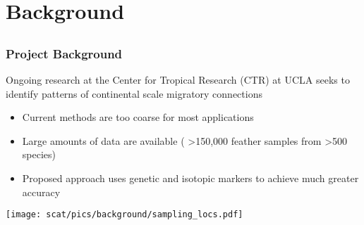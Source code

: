 \section{Background}
\subsection{}

\begin{frame}
\frametitle{Project Background}

Ongoing research at the Center for Tropical Research (CTR) at UCLA seeks to identify patterns of continental scale migratory connections 

\begin{itemize}
\item Current methods are too coarse for most applications
\item Large amounts of data are available ( \textgreater{}150,000 feather samples from \textgreater{}500 species)
\item Proposed approach uses genetic and isotopic markers to achieve much greater accuracy
\end{itemize}

\end{frame}


\begin{frame}
\begin{center}
\texttt{[image: scat/pics/background/sampling\_locs.pdf]}
\end{center}
\end{frame}



